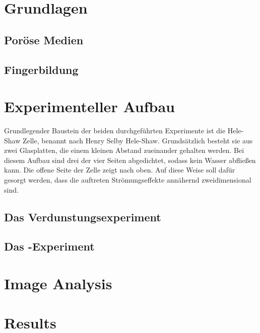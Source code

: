 \documentclass[oneside, a4paper, DIV=11]{scrartcl}
\begin{document}
\section{Grundlagen}
\label{sec:theo}
\subsection{Poröse Medien}
\label{theo:por}
\subsection{Fingerbildung}
\label{theo:fing}
\subsection{}


\section{Experimenteller Aufbau}
\label{sec:set}

Grundlegender Baustein der beiden durchgeführten Experimente ist die Hele-Shaw Zelle, benannt nach Henry Selby Hele-Shaw. Grundsätzlich besteht sie aus zwei
Glasplatten, die einem kleinen Abstand zueinander gehalten werden. Bei diesem Aufbau sind drei der vier Seiten abgedichtet, sodass kein Wasser abfließen kann.
Die offene Seite der Zelle zeigt nach oben. Auf diese Weise soll dafür gesorgt werden, dass die auftreten Strömungseffekte annähernd zweidimensional sind.


\subsection{Das Verdunstungsexperiment}
\label{set:eva}
\subsection{Das \COT-Experiment}
\label{set:cot}

\section{Image Analysis}
\label{sec:ima}


\section{Results}
\label{sec:res}
\end{document}
